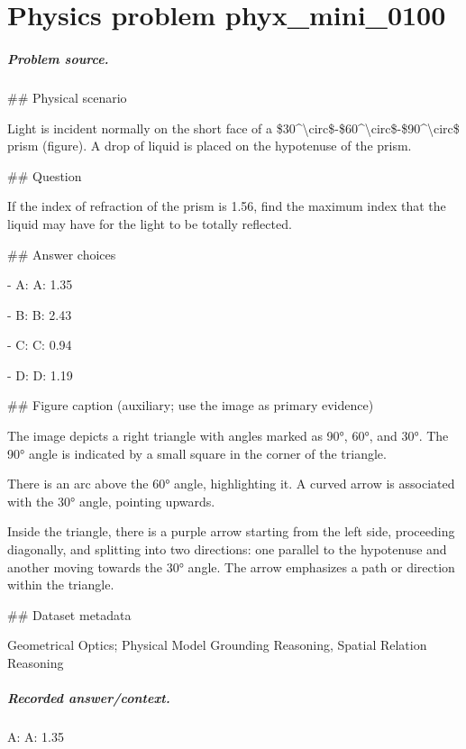 
\chapter{Physics problem phyx\_mini\_0100}
\label{ch:PhyXMiniProblems_problem_phyx_mini_0100}

\paragraph{Problem source.}
\#\# Physical scenario

Light is incident normally on the short face of a \$30\textasciicircum{}\textbackslash{}circ\$-\$60\textasciicircum{}\textbackslash{}circ\$-\$90\textasciicircum{}\textbackslash{}circ\$ prism (figure). A drop of liquid is placed on the hypotenuse of the prism.

\#\# Question

If the index of refraction of the prism is 1.56, find the maximum index that the liquid may have for the light to be totally reflected.

\#\# Answer choices

- A: A: 1.35

- B: B: 2.43

- C: C: 0.94

- D: D: 1.19

\#\# Figure caption (auxiliary; use the image as primary evidence)

The image depicts a right triangle with angles marked as 90°, 60°, and 30°. The 90° angle is indicated by a small square in the corner of the triangle. 

There is an arc above the 60° angle, highlighting it. A curved arrow is associated with the 30° angle, pointing upwards. 

Inside the triangle, there is a purple arrow starting from the left side, proceeding diagonally, and splitting into two directions: one parallel to the hypotenuse and another moving towards the 30° angle. The arrow emphasizes a path or direction within the triangle.

\#\# Dataset metadata

Geometrical Optics; Physical Model Grounding Reasoning, Spatial Relation Reasoning

\paragraph{Recorded answer/context.}
A: A: 1.35

